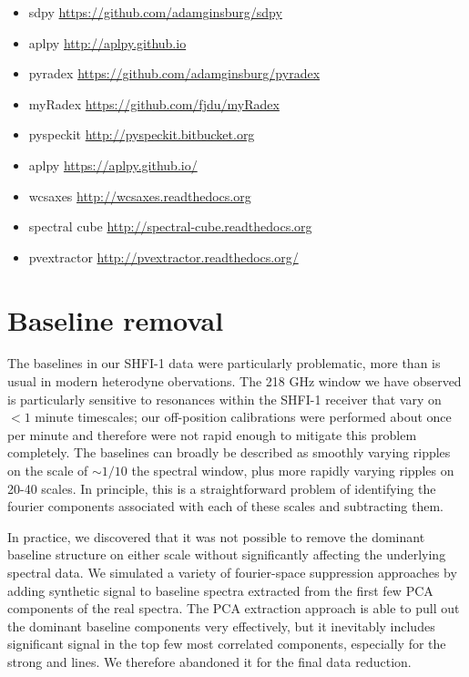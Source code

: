\begin{itemize}
    \item sdpy \url{https://github.com/adamginsburg/sdpy}
    \item aplpy \url{http://aplpy.github.io}
    \item pyradex \url{https://github.com/adamginsburg/pyradex}
    \item myRadex \url{https://github.com/fjdu/myRadex}
    \item pyspeckit \url{http://pyspeckit.bitbucket.org}
    \item aplpy \url{https://aplpy.github.io/}
    \item wcsaxes \url{http://wcsaxes.readthedocs.org}
    \item spectral cube \url{http://spectral-cube.readthedocs.org}
    \item pvextractor \url{http://pvextractor.readthedocs.org/}
\end{itemize}

\appendix
\section{Baseline removal}
\label{sec:baselineappendix}
The baselines in our SHFI-1 data were particularly problematic, more than is
usual in modern heterodyne obervations.  The 218 GHz window we have observed is
particularly sensitive to resonances within the SHFI-1 receiver that vary on
$<1$ minute timescales; our off-position calibrations were performed about once
per minute and therefore were not rapid enough to mitigate this problem
completely.  The baselines can broadly be described as smoothly varying ripples
on the scale of $\sim1/10$ the spectral window, plus more rapidly varying
ripples on 20-40 \kms scales.  In principle, this is a straightforward problem
of identifying the fourier components associated with each of these scales and
subtracting them.

In practice, we discovered that it was not possible to remove the dominant
baseline structure on either scale without significantly affecting the
underlying spectral data.  We simulated a variety of fourier-space suppression
approaches by adding synthetic signal to baseline spectra extracted from the
first few PCA components of the real spectra.
The PCA extraction approach is able to pull out the dominant baseline
components very effectively, but it inevitably includes significant signal in
the top few most correlated components, especially for the strong \formaldehyde
and \thirteenco lines.  We therefore abandoned it for the final data reduction.


